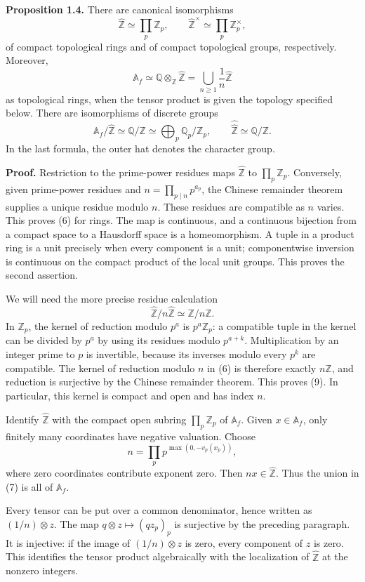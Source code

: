 \documentclass[
  english,
  11pt,
  a4paper,
]{article}
\begin{document}
\textbf{Proposition 1.4.} There are canonical isomorphisms
\[\widehat{\mathbb Z}\simeq\prod_p\mathbb Z_p,
\qquad
\widehat{\mathbb Z}^{\times}\simeq\prod_p\mathbb Z_p^{\times},
\tag{6}\] of compact topological rings and of compact topological
groups, respectively. Moreover,
\[\mathbb A_f\simeq\mathbb Q\otimes_{\mathbb Z}\widehat{\mathbb Z}
=\bigcup_{n\geq1}\frac1n\widehat{\mathbb Z}
\tag{7}\] as topological rings, when the tensor product is given the
topology specified below. There are isomorphisms of discrete groups
\[\mathbb A_f/\widehat{\mathbb Z}
\simeq\mathbb Q/\mathbb Z
\simeq\bigoplus_p\mathbb Q_p/\mathbb Z_p,
\qquad
\widehat{\widehat{\mathbb Z}}\simeq\mathbb Q/\mathbb Z.
\tag{8}\] In the last formula, the outer hat denotes the character
group.

\textbf{Proof.} Restriction to the prime-power residues maps
\(\widehat{\mathbb Z}\) to \(\prod_p\mathbb Z_p\). Conversely, given
prime-power residues and \(n=\prod_{p\mid n}p^{a_p}\), the Chinese
remainder theorem supplies a unique residue modulo \(n\). These residues
are compatible as \(n\) varies. This proves (6) for rings. The map is
continuous, and a continuous bijection from a compact space to a
Hausdorff space is a homeomorphism. A tuple in a product ring is a unit
precisely when every component is a unit; componentwise inversion is
continuous on the compact product of the local unit groups. This proves
the second assertion.

We will need the more precise residue calculation
\[\widehat{\mathbb Z}/n\widehat{\mathbb Z}\simeq\mathbb Z/n\mathbb Z.
\tag{9}\] In \(\mathbb Z_p\), the kernel of reduction modulo \(p^a\) is
\(p^a\mathbb Z_p\): a compatible tuple in the kernel can be divided by
\(p^a\) by using its residues modulo \(p^{a+k}\). Multiplication by an
integer prime to \(p\) is invertible, because its inverses modulo every
\(p^k\) are compatible. The kernel of reduction modulo \(n\) in (6) is
therefore exactly \(n\widehat{\mathbb Z}\), and reduction is surjective
by the Chinese remainder theorem. This proves (9). In particular, this
kernel is compact and open and has index \(n\).

Identify \(\widehat{\mathbb Z}\) with the compact open subring
\(\prod_p\mathbb Z_p\) of \(\mathbb A_f\). Given \(x\in\mathbb A_f\),
only finitely many coordinates have negative valuation. Choose
\[n=\prod_p p^{\max(0,-v_p(x_p))},\] where zero coordinates contribute
exponent zero. Then \(nx\in\widehat{\mathbb Z}\). Thus the union in (7)
is all of \(\mathbb A_f\).

Every tensor can be put over a common denominator, hence written as
\((1/n)\otimes z\). The map \(q\otimes z\mapsto(qz_p)_p\) is surjective
by the preceding paragraph. It is injective: if the image of
\((1/n)\otimes z\) is zero, every component of \(z\) is zero. This
identifies the tensor product algebraically with the localization of
\(\widehat{\mathbb Z}\) at the nonzero integers.
\end{document}
